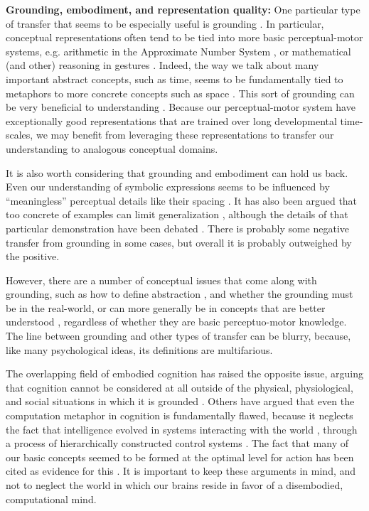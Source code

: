\textbf{Grounding, embodiment, and representation quality:} One particular type of transfer that seems to be especially useful is grounding \citep{Barsalou2007}. In particular, conceptual representations often tend to be tied into more basic perceptual-motor systems, e.g. arithmetic in the Approximate Number System \citep{Park2013}, or mathematical (and other) reasoning in gestures \citep{Goldin-Meadow1993, Goldin-Meadow1999}. Indeed, the way we talk about many important abstract concepts, such as time, seems to be fundamentally tied to metaphors to more concrete concepts such as space \citep{Lakoff1980}. This sort of grounding can be very beneficial to understanding \citep{Nathan2008, Schwartz2015, Wakefield2018}. Because our perceptual-motor system have exceptionally good representations that are trained over long developmental time-scales, we may benefit from leveraging these representations to transfer our understanding to analogous conceptual domains. \par 
It is also worth considering that grounding and embodiment can hold us back. Even our understanding of symbolic expressions seems to be influenced by ``meaningless'' perceptual details like their spacing \citep{Landy2007}. It has also been argued that too concrete of examples can limit generalization \citep{Kaminski2008}, although the details of that particular demonstration have been debated \citep{DeBock2011, Lampinen2017b}. There is probably some negative transfer from grounding in some cases, but overall it is probably outweighed by the positive. \par
However, there are a number of conceptual issues that come along with grounding, such as how to define abstraction \citep{Dove2016}, and whether the grounding must be in the real-world, or can more generally be in concepts that are better understood \citep{Wilensky1991}, regardless of whether they are basic perceptuo-motor knowledge. The line between grounding and other types of transfer can be blurry, because, like many psychological ideas, its definitions are multifarious. \par 
The overlapping field of embodied cognition has raised the opposite issue, arguing that cognition cannot be considered at all outside of the physical, physiological, and social situations in which it is grounded \citep{Anderson2003}. Others have argued that even the computation metaphor in cognition is fundamentally flawed, because it neglects the fact that intelligence evolved in systems interacting with the world \citep{Cisek1999}, through a process of hierarchically constructed control systems \citep{Cisek2019}. The fact that many of our basic concepts seemed to be formed at the optimal level for action \citep{Rosch1976} has been cited as evidence for this \citep{Lakoff1999}. It is important to keep these arguments in mind, and not to neglect the world in which our brains reside in favor of a disembodied, computational mind. \par 
